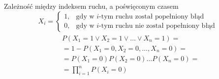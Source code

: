 \documentclass{beamer}
\begin{document}
\begin{frame}{Zależność między indeksem ruchu, a poświęconym czasem}
	\begin{equation*}
		X_i =
		\begin{cases}
			1, & \text{gdy w $i$-tym ruchu został popełniony błąd}\\
			0, & \text{gdy w $i$-tym ruchu nie został popełniony błąd}
		\end{cases}       
	\end{equation*}
\begin{multline*}
	\begin{split}
		& P(X_1 = 1 \vee X_2 = 1 \vee \dots \vee X_n = 1) =\\
		& = 1 - P(X_1 = 0, X_2 = 0,\dots, X_n = 0) = \\
		& = P(X_1 = 0)P(X_2 = 0)\dots P(X_n = 0) = \\
		& = \prod_{i=1}^{n}P(X_i=0)
	\end{split}
\end{multline*}
\end{frame}
\end{document}
